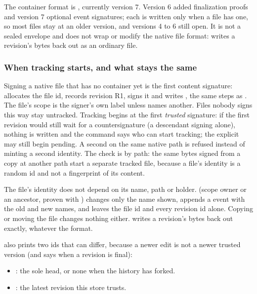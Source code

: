The container format is , currently version 7. Version 6 added
finalization proofs and version 7 optional event signatures; each is written
only when a file has one, so most files stay at an older version, and
versions 4 to 6 still open. It is not a sealed envelope and does not wrap or modify the
native file format:  writes a revision's bytes back out
as an ordinary file.

\subsubsection*{When tracking starts, and what stays the same}

Signing a native file that has no container yet is the first content
signature:  allocates the
file id, records revision R1, signs it and writes
, the same steps as . The file's
scope is the signer's own label unless  names another. Files nobody
signs this way stay untracked. Tracking begins at the first \emph{trusted}
signature: if the first revision would still wait for a countersignature (a
descendant signing alone), nothing is written and the command says who can
start tracking; the explicit  may still begin pending. A
second  on the same native path is refused instead of minting
a second identity. The check is by path: the same bytes signed from a copy at
another path start a separate tracked file, because a file's identity is a
random id and not a fingerprint of its content.

The file's identity does not depend on its name, path or holder.
 (scope owner or an ancestor, proven with )
changes only the name shown, appends a  event with the
old and new names, and leaves the file id and every revision id alone.
Copying or moving the  file changes nothing either.
 writes a revision's bytes back out exactly, whatever
the format.

 also prints two ids that can differ, because a newer
edit is not a newer trusted version (and says when a revision is final):

\begin{itemize}
  \item {}: the sole head, or none when the history
  has forked.
  \item {}: the latest revision this store trusts.
\end{itemize}

